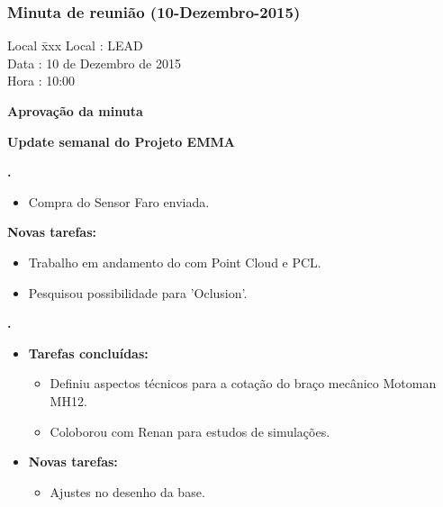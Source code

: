 \subsubsection{Minuta de reunião (10-Dezembro-2015)}

\begin{tabbing}
  Local \= xxx \kill
  Local \> : LEAD \\
  Data  \> : 10 de Dezembro de 2015 \\
  Hora  \> : 10:00
\end{tabbing} 


\textbf{Aprovação da minuta}

\textbf{Update semanal do Projeto EMMA}
   									
						
\textbf{\gabriel.} 
	\begin{itemize}
			\item Compra do Sensor Faro enviada.
			\end{itemize}
		
		\item \textbf{Novas tarefas:}
			\begin{itemize} 
				\item Trabalho em andamento do com Point Cloud e PCL.
				\item Pesquisou possibilidade para 'Oclusion'.
			\end{itemize}

					
   \textbf{.} 
	\begin{itemize}
		\item \textbf{Tarefas concluídas:}
			\begin{itemize}    
			    \item Definiu aspectos técnicos para a cotação do braço mecânico
			    Motoman MH12.
			    \item Coloborou com Renan para estudos de simulações.
				
			\end{itemize}
		
		\item \textbf{Novas tarefas:}
			\begin{itemize} 
			    \item Ajustes no desenho da base.
			\end{itemize}
	\end{itemize}

